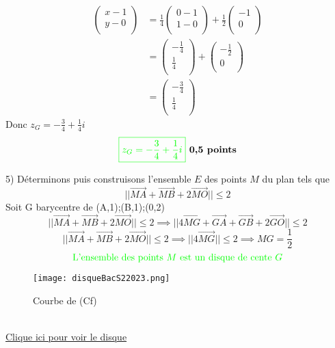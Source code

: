 \documentclass[12pt]{article}
\begin{document}
\begin{itemize}
\begin{align*}
\begin{pmatrix}x-1 \\y-0 \\ \end{pmatrix} &=\frac{1}{4}\begin{pmatrix}0-1 \\1-0 \\ \end{pmatrix}+\frac{1}{2}\begin{pmatrix}-1 \\0 \\ \end{pmatrix} \\
&=\begin{pmatrix}-\frac{1}{4} \\ \frac{1}{4} \\ \end{pmatrix}+\begin{pmatrix}-\frac{1}{2} \\0 \\ \end{pmatrix}\\
&=\begin{pmatrix}-\frac{3}{4} \\ \frac{1}{4} \\ \end{pmatrix}
\end{align*}
Donc \( z_{G}=-\frac{3}{4}+\frac{1}{4}i \)
\[
\textcolor{green}{\boxed{ z_{G}=-\frac{3}{4}+\frac{1}{4}i }} \textbf{ 0,5 points}
\]
\end{itemize}

5) Déterminons puis construisons l'ensemble \( E \) des points \( M \) du plan tels que
\[
||\overrightarrow{MA} + \overrightarrow{MB} + 2\overrightarrow{MO}|| \leq 2
\]
Soit G barycentre de (A,1);(B,1);(0,2)
\[
||\overrightarrow{MA} + \overrightarrow{MB} + 2\overrightarrow{MO}|| \leq 2\implies
||4\overrightarrow{MG} +\overrightarrow{GA}+\overrightarrow{GB} + 2\overrightarrow{GO}|| \leq 2
\] 
\[
||\overrightarrow{MA} + \overrightarrow{MB} + 2\overrightarrow{MO}|| \leq 2\implies
||4\overrightarrow{MG}|| \leq 2\implies MG=\frac{1}{2}
\] 
\[\textcolor{green}{ \text{L'ensemble des points $M$ est un disque de cente $G$} }\]
\begin{figure}[h]
\centering
\texttt{[image: disqueBacS22023.png]}
\caption{Courbe de (Cf)}
\label{fig:monimage}
\end{figure}\\
\href{https://www.geogebra.org/classic/x9c5uduz}{Clique ici pour voir le disque}
\end{document}
